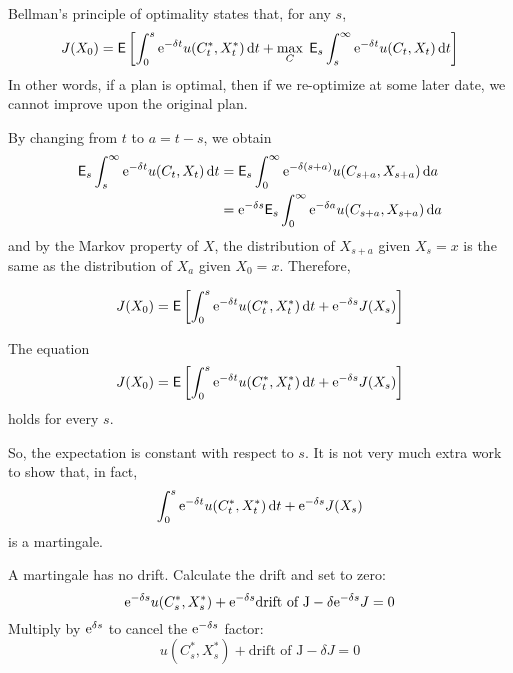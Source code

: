 \documentclass[xcolor=dvipsnames,10pt]{beamer}
\begin{document}
      \begin{frame}
    Bellman's principle of optimality states that, for any $s$,
    $$J(X_0) = \mathsf{E} \left[\int_0^s \mathrm{e}^{-\delta t}u(C^*_t,X^*_t)\,\mathrm{d} t + \max_C\; \mathsf{E}_s\int_s^\infty \mathrm{e}^{-\delta t}u(C_t,X_t)\,\mathrm{d} t\right]$$
    In other words, if a plan is optimal, then if we re-optimize at some later date, we cannot improve upon the original plan.
    
    By changing from $t$ to $a = t-s$, we obtain 
    \begin{align*}
        \mathsf{E}_s\int_s^\infty \mathrm{e}^{-\delta t}u(C_t,X_t)\,\mathrm{d} t &= \mathsf{E}_s\int_0^\infty \mathrm{e}^{-\delta (s+a)}u(C_{s+a},X_{s+a})\,\mathrm{d} a\\
        &= \mathrm{e}^{-\delta s} \mathsf{E}_s\int_0^\infty \mathrm{e}^{-\delta a}u(C_{s+a},X_{s+a})\,\mathrm{d} a
    \end{align*}
    and by the Markov property of $X$, the distribution of $X_{s+a}$ given $X_s=x$ is the same as the distribution of $X_a$ given $X_0=x$.  Therefore,
     
    $$J(X_0) = \mathsf{E} \left[\int_0^s \mathrm{e}^{-\delta t}u(C^*_t,X^*_t)\,\mathrm{d} t + \mathrm{e}^{-\delta s}J(X_s)\right]$$
\end{frame}

\begin{frame}
The equation
$$J(X_0) = \mathsf{E} \left[\int_0^s \mathrm{e}^{-\delta t}u(C^*_t,X^*_t)\,\mathrm{d} t + \mathrm{e}^{-\delta s}J(X_s)\right]$$
holds for every $s$.

So, the expectation is constant with respect to $s$.  It is not very much extra work to show that, in fact, 
        $$\int_0^s \mathrm{e}^{-\delta t}u(C^*_t,X^*_t)\,\mathrm{d} t + \mathrm{e}^{-\delta s}J(X_s)$$
    is a martingale.  
 
 A martingale has no drift.  Calculate the drift and set to zero:
$$\mathrm{e}^{-\delta s}u(C^*_s,X^*_s) + \mathrm{e}^{-\delta s}\text{drift of J} - \delta \mathrm{e}^{-\delta s}J = 0$$
Multiply by $\mathrm{e}^{\delta s}$ to cancel the $\mathrm{e}^{-\delta s}$ factor:
$$u(C^*_s,X^*_s) + \text{drift of J} - \delta J = 0$$   
\end{frame}
\end{document}
